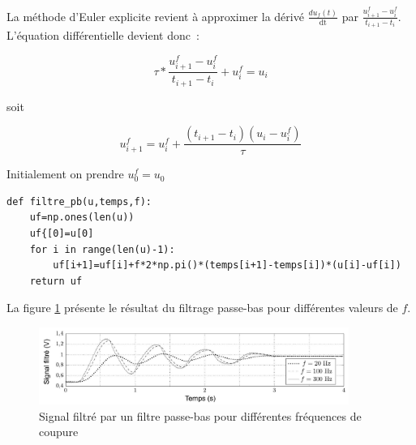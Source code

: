 \ifprof
\begin{texteCache}
La méthode d'Euler explicite revient à approximer la dérivé
  \(\frac{du_{f}(t)}{\text{dt}}\) par
  \(\frac{u_{i + 1}^{f} - u_{i}^{f}}{t_{i + 1} - t_{i}}\). L'équation
  différentielle devient donc~:

\[\tau*\frac{u_{i + 1}^{f} - u_{i}^{f}}{t_{i + 1} - t_{i}} + u_{i}^{f} = u_{i}\]

soit

\[u_{i + 1}^{f} = u_{i}^{f} + \frac{\left( t_{i + 1} - t_{i} \right)\left( u_{i} - u_{i}^{f} \right)}{\tau}\]

Initialement on prendre \(u_{0}^{f} = u_{0}\)

  \vspace{2cm}
\end{texteCache}
\else

\fi



\ifprof
\begin{texteCache}

\begin{lstlisting}
def filtre_pb(u,temps,f):
	uf=np.ones(len(u))
	uf{[0]=u[0]
 	for i in range(len(u)-1):
		uf[i+1]=uf[i]+f*2*np.pi()*(temps[i+1]-temps[i])*(u[i]-uf[i])
	return uf
\end{lstlisting}

  \vspace{2cm}

\end{texteCache}
\else



%
La figure \ref{fig12} présente le résultat du filtrage passe-bas pour différentes valeurs de $f$.

\begin{figure}[!htb]
\begin{center}
\includegraphics[width=0.9\textwidth]{images/2023_10_30_d11e80da56f59e3b3cdfg-10(1)}
\caption{Signal filtré par un filtre passe-bas pour différentes fréquences de coupure \label{fig12}}
\end{center}
\end{figure}



